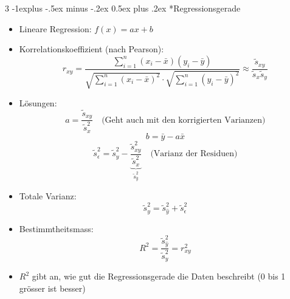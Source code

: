 \documentclass[10pt,a4paper,landscape]{article}
\makeatletter
\renewcommand{\subsection}{\@startsection{subsection}{2}{0mm}%
                                {-1explus -.5ex minus -.2ex}%
                                {0.5ex plus .2ex}%
                                {\normalfont\normalsize\bfseries}}
\makeatother
\begin{document}
\begin{multicols*}{3}
		 \subsection*{Regressionsgerade}
			 \begin{itemize}
				 \item Lineare Regression: $f(x) = a x + b$
				 \item Korrelationskoeffizient (nach Pearson):
				       \begin{equation*}
					       r_{xy} = \frac{\sum_{i=1}^{n} (x_i - \bar{x})(y_i - \bar{y})}{\sqrt{\sum_{i=1}^{n} (x_i - \bar{x})^2} \cdot \sqrt{\sum_{i=1}^{n} (y_i - \bar{y})^2}} \approx \frac{\tilde{s}_{xy}}{\tilde{s}_x \tilde{s}_y}
				       \end{equation*}
				 \item Lösungen:
				       \begin{equation*}
					       a = \frac{\tilde{s}_{xy}}{\tilde{s}_x^2} \quad \text{(Geht auch mit den korrigierten Varianzen)}
				       \end{equation*}
				       \begin{equation*}
					       b = \bar{y} - a \bar{x}
				       \end{equation*}
				       \begin{equation*}
					       \tilde{s}_{\epsilon}^2 = \tilde{s}_y^2 - \underbrace{\frac{\tilde{s}_{xy}^2}{\tilde{s}_x^2}}_{\tilde{s}_{\hat{y}}^2} \quad \text{(Varianz der Residuen)}
				       \end{equation*}
				 \item Totale Varianz:
				       \begin{equation*}
					       \tilde{s}_y^2 = \tilde{s}_{\hat{y}}^2 + \tilde{s}_{\epsilon}^2
				       \end{equation*}
				 \item Bestimmtheitsmass:
				       \begin{equation*}
					       R^2 = \frac{\tilde{s}_{\hat{y}}^2}{\tilde{s}_y^2} = r^2_{xy}
				       \end{equation*}
				 \item $R^2$ gibt an, wie gut die Regressionsgerade die Daten beschreibt (0 bis 1 grösser ist besser)
			 \end{itemize}


\end{multicols*}
\end{document}
